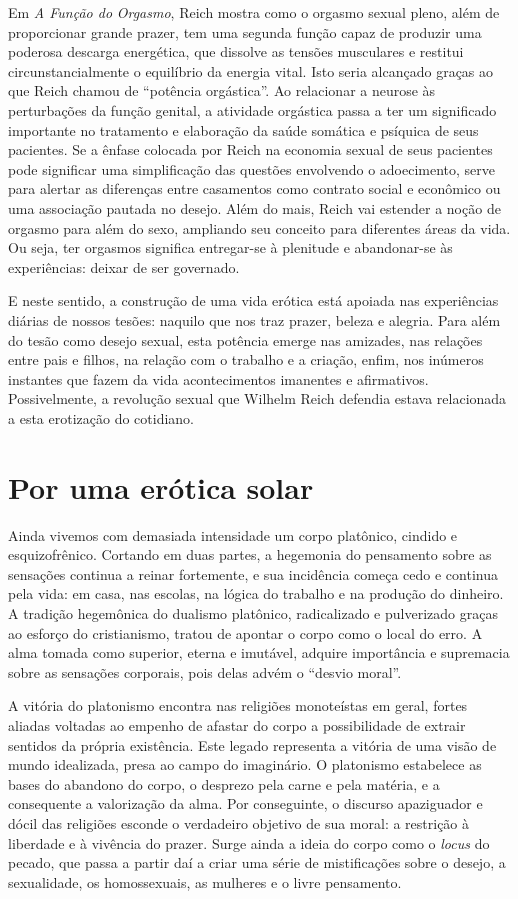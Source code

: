 Em \emph{A Função do} \emph{Orgasmo}, Reich mostra como o orgasmo sexual
pleno, além de proporcionar grande prazer, tem uma segunda função capaz
de produzir uma poderosa descarga energética, que dissolve as tensões
musculares e restitui circunstancialmente o equilíbrio da energia vital.
Isto seria alcançado graças ao que Reich chamou de ``potência
orgástica''. Ao relacionar a neurose às perturbações da função genital,
a atividade orgástica passa a ter um significado importante no
tratamento e elaboração da saúde somática e psíquica de seus pacientes.
Se a ênfase colocada por Reich na economia sexual de seus pacientes pode
significar uma simplificação das questões envolvendo o adoecimento,
serve para alertar as diferenças entre casamentos como contrato social e
econômico ou uma associação pautada no desejo. Além do mais, Reich vai
estender a noção de orgasmo para além do sexo, ampliando seu conceito
para diferentes áreas da vida. Ou seja, ter orgasmos significa
entregar-se à plenitude e abandonar-se às experiências: deixar de ser
governado.

E neste sentido, a construção de uma vida erótica está apoiada nas
experiências diárias de nossos tesões: naquilo que nos traz prazer,
beleza e alegria. Para além do tesão como desejo sexual, esta potência
emerge nas amizades, nas relações entre pais e filhos, na relação com o
trabalho e a criação, enfim, nos inúmeros instantes que fazem da vida
acontecimentos imanentes e afirmativos. Possivelmente, a revolução
sexual que Wilhelm Reich defendia estava relacionada a esta erotização
do cotidiano.

\section{Por uma erótica solar}

Ainda vivemos com demasiada intensidade um corpo platônico, cindido e
esquizofrênico. Cortando em duas partes, a hegemonia do pensamento sobre
as sensações continua a reinar fortemente, e sua incidência começa cedo
e continua pela vida: em casa, nas escolas, na lógica do trabalho e na
produção do dinheiro. A tradição hegemônica do dualismo platônico,
radicalizado e pulverizado graças ao esforço do cristianismo, tratou de
apontar o corpo como o local do erro. A alma tomada como superior,
eterna e imutável, adquire importância e supremacia sobre as sensações
corporais, pois delas advém o ``desvio moral''.

A vitória do platonismo encontra nas religiões monoteístas em geral,
fortes aliadas voltadas ao empenho de afastar do corpo a possibilidade
de extrair sentidos da própria existência. Este legado representa a
vitória de uma visão de mundo idealizada, presa ao campo do imaginário.
O platonismo estabelece as bases do abandono do corpo, o desprezo pela
carne e pela matéria, e a consequente a valorização da alma. Por
conseguinte, o discurso apaziguador e dócil das religiões esconde o
verdadeiro objetivo de sua moral: a restrição à liberdade e à vivência
do prazer. Surge ainda a ideia do corpo como o \emph{locus} do pecado,
que passa a partir daí a criar uma série de mistificações sobre o
desejo, a sexualidade, os homossexuais, as mulheres e o livre
pensamento.

